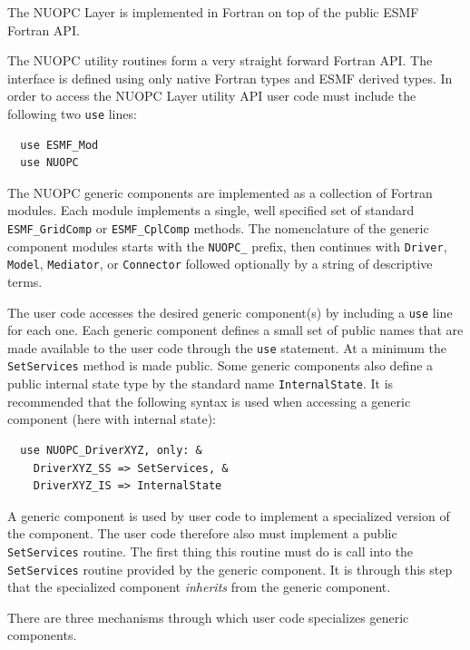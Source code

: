 
The NUOPC Layer is implemented in Fortran on top of the public ESMF Fortran API.

The NUOPC utility routines form a very straight forward Fortran API. The interface is defined using only native Fortran types and ESMF derived types. In order to access the NUOPC Layer utility API user code must include the following two {\tt use} lines:

\begin{verbatim}
  use ESMF_Mod
  use NUOPC
\end{verbatim}

The NUOPC generic components are implemented as a collection of Fortran modules. Each module implements a single, well specified set of standard {\tt ESMF\_GridComp} or {\tt ESMF\_CplComp} methods. The nomenclature of the generic component modules starts with the {\tt NUOPC\_} prefix, then continues with {\tt Driver}, {\tt Model}, {\tt Mediator}, or {\tt Connector} followed optionally by a string of descriptive terms.

The user code accesses the desired generic component(s) by including a {\tt use} line for each one. Each generic component defines a small set of public names that are made available to the user code through the {\tt use} statement. At a minimum the {\tt SetServices} method is made public. Some generic components also define a public internal state type by the standard name {\tt InternalState}. It is recommended that the following syntax is used when accessing a generic component (here with internal state):

\begin{verbatim}
  use NUOPC_DriverXYZ, only: &
    DriverXYZ_SS => SetServices, &
    DriverXYZ_IS => InternalState
\end{verbatim}

A generic component is used by user code to implement a specialized version of the component. The user code therefore also must implement a public {\tt SetServices} routine. The first thing this routine must do is call into the {\tt SetServices} routine provided by the generic component. It is through this step that the specialized component {\em inherits} from the generic component.

There are three mechanisms through which user code specializes generic components.

